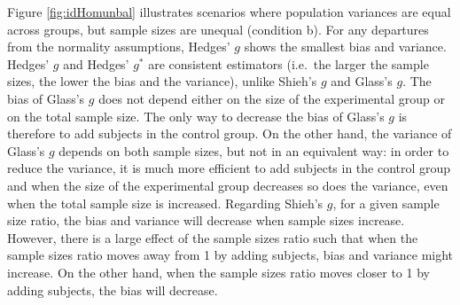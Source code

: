 \documentclass[
  12pt,
  french,
]{article}
\begin{document}
Figure \ref{fig:idHomunbal} illustrates scenarios where population
variances are equal across groups, but sample sizes are unequal
(condition b). For any departures from the normality assumptions,
Hedges' \(g\) shows the smallest bias and variance. Hedges' \(g\) and
Hedges' \(g^*\) are consistent estimators (i.e.~the larger the sample
sizes, the lower the bias and the variance), unlike Shieh's \(g\) and
Glass's \(g\). The bias of Glass's \(g\) does not depend either on the
size of the experimental group or on the total sample size. The only way
to decrease the bias of Glass's \(g\) is therefore to add subjects in
the control group. On the other hand, the variance of Glass's \(g\)
depends on both sample sizes, but not in an equivalent way: in order to
reduce the variance, it is much more efficient to add subjects in the
control group and when the size of the experimental group decreases so
does the variance, even when the total sample size is increased.
Regarding Shieh's \(g\), for a given sample size ratio, the bias and
variance will decrease when sample sizes increase. However, there is a
large effect of the sample sizes ratio such that when the sample sizes
ratio moves away from 1 by adding subjects, bias and variance might
increase.
On the other hand, when the sample sizes ratio moves closer to 1 by
adding subjects, the bias will decrease.
\end{document}
